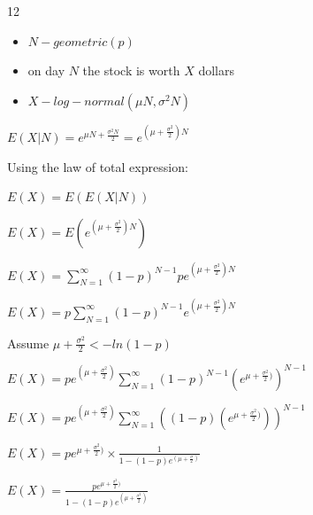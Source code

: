 \documentclass[12 pt]{article}
\begin{document}
    \begin{exercise}{12}
    \hfill

    \begin{itemize}
        \item $N - geometric(p)$
        \item on day $N$ the stock is worth $X$ dollars
        \item $X - log-normal(\mu N, \sigma^2 N)$
    \end{itemize}

    \hfill

    $E(X|N) = e^{\mu N + \frac{\sigma^2 N}{2}} = e^{(\mu + \frac{\sigma^2}{2})N}$

    \hfill

    Using the law of total expression:

    $E(X) = E(E(X|N))$

    $E(X) = E(e^{(\mu + \frac{\sigma^2}{2})N})$

    $E(X) = \sum_{N=1}^{\infty} (1-p)^{N-1} p e^{(\mu + \frac{\sigma^2}{2})N}$

    $E(X) = p \sum_{N=1}^{\infty} (1-p)^{N-1} e^{(\mu + \frac{\sigma^2}{2})N}$

    \hfill

    Assume $\mu + \frac{\sigma^2}{2} < -ln(1-p)$

    \hfill

    $E(X) = p e^{(\mu + \frac{\sigma^2}{2})} \sum_{N=1}^{\infty} (1-p)^{N-1} (e^{\mu + \frac{\sigma^2}{2})})^{N-1}$

    $E(X) = p e^{(\mu + \frac{\sigma^2}{2})} \sum_{N=1}^{\infty} ((1-p) (e^{\mu + \frac{\sigma^2}{2})}))^{N-1}$

    $E(X) = pe^{\mu + \frac{\sigma^2}{2})} \times \frac{1}{1 - (1-p)e^{(\mu + \frac{\sigma}{2})}}$

    $E(X) = \frac{pe^{\mu + \frac{\sigma^2}{2})}}{1 - (1-p)e^{(\mu + \frac{\sigma^2}{2})}}$

    \hfill
    \end{exercise}
\end{document}
